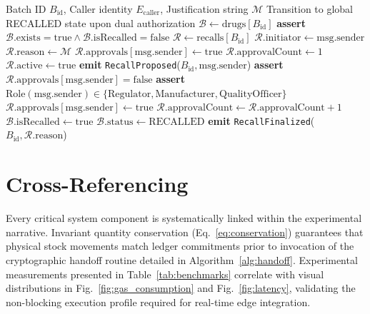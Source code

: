 \documentclass[pdflatex,sn-mathphys-num]{sn-jnl}
\theoremstyle{thmstyleone}
\theoremstyle{thmstyletwo}
\theoremstyle{thmstylethree}
\begin{document}
\begin{algorithm}[ht]
\caption{Multi-Party 2-of-$N$ Consensus Recall Execution}\label{alg:recall}
\begin{algorithmic}[1]
\Require Batch ID $B_{\text{id}}$, Caller identity $E_{\text{caller}}$, Justification string $\mathcal{M}$
\Ensure Transition to global RECALLED state upon dual authorization
\State $\mathcal{B} \gets \text{drugs}[B_{\text{id}}]$
\State \textbf{assert} $\mathcal{B}.\text{exists} = \text{true} \land \mathcal{B}.\text{isRecalled} = \text{false}$
\State $\mathcal{R} \gets \text{recalls}[B_{\text{id}}]$
    \State $\mathcal{R}.\text{initiator} \gets \text{msg.sender}$
    \State $\mathcal{R}.\text{reason} \gets \mathcal{M}$
    \State $\mathcal{R}.\text{approvals}[\text{msg.sender}] \gets \text{true}$
    \State $\mathcal{R}.\text{approvalCount} \gets 1$
    \State $\mathcal{R}.\text{active} \gets \text{true}$
    \State \textbf{emit} \texttt{RecallProposed}($B_{\text{id}}, \text{msg.sender}$)
\Else
    \State \textbf{assert} $\mathcal{R}.\text{approvals}[\text{msg.sender}] = \text{false}$ 
    \State \textbf{assert} $\text{Role}(\text{msg.sender}) \in \{\text{Regulator}, \text{Manufacturer}, \text{QualityOfficer}\}$
    \State $\mathcal{R}.\text{approvals}[\text{msg.sender}] \gets \text{true}$
    \State $\mathcal{R}.\text{approvalCount} \gets \mathcal{R}.\text{approvalCount} + 1$
        \State $\mathcal{B}.\text{isRecalled} \gets \text{true}$
        \State $\mathcal{B}.\text{status} \gets \text{RECALLED}$
        \State \textbf{emit} \texttt{RecallFinalized}($B_{\text{id}}, \mathcal{R}.\text{reason}$)
    \EndIf
\EndIf
\end{algorithmic}
\end{algorithm}

\section{Cross-Referencing}\label{sec8}

Every critical system component is systematically linked within the experimental narrative. Invariant quantity conservation (Eq.~\ref{eq:conservation}) guarantees that physical stock movements match ledger commitments prior to invocation of the cryptographic handoff routine detailed in Algorithm~\ref{alg:handoff}. Experimental measurements presented in Table~\ref{tab:benchmarks} correlate with visual distributions in Fig.~\ref{fig:gas_consumption} and Fig.~\ref{fig:latency}, validating the non-blocking execution profile required for real-time edge integration.
\end{document}
